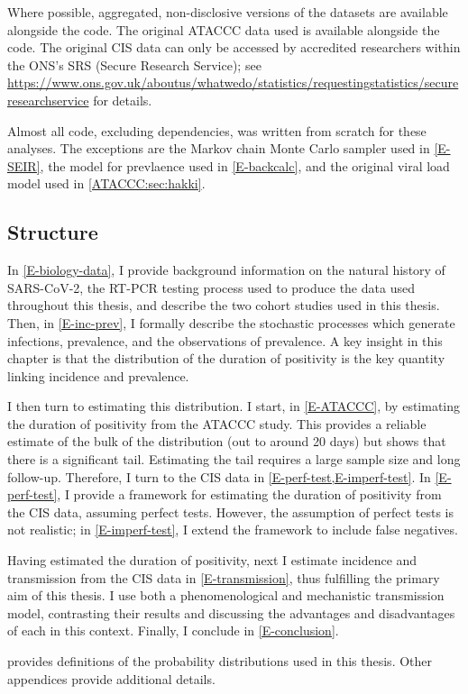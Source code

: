 \documentclass[thesis.tex]{subfiles}
\begin{document}
Where possible, aggregated, non-disclosive versions of the datasets are available alongside the code.
The original ATACCC data used is available alongside the code.
The original CIS data can only be accessed by accredited researchers within the ONS's SRS (Secure Research Service); see \url{https://www.ons.gov.uk/aboutus/whatwedo/statistics/requestingstatistics/secureresearchservice} for details.

Almost all code, excluding dependencies, was written from scratch for these analyses.
The exceptions are the Markov chain Monte Carlo sampler used in \cref{E-SEIR}, the model for prevlaence used in \cref{E-backcalc}, and the original viral load model used in \cref{ATACCC:sec:hakki}.

\subsection{Structure}

In \cref{E-biology-data}, I provide background information on the natural history of SARS-CoV-2, the RT-PCR testing process used to produce the data used throughout this thesis, and describe the two cohort studies used in this thesis.
Then, in \cref{E-inc-prev}, I formally describe the stochastic processes which generate infections, prevalence, and the observations of prevalence.
A key insight in this chapter is that the distribution of the duration of positivity is the key quantity linking incidence and prevalence.

I then turn to estimating this distribution.
I start, in \cref{E-ATACCC}, by estimating the duration of positivity from the ATACCC study.
This provides a reliable estimate of the bulk of the distribution (out to around 20 days) but shows that there is a significant tail.
Estimating the tail requires a large sample size and long follow-up. 
Therefore, I turn to the CIS data in \cref{E-perf-test,E-imperf-test}.
In \cref{E-perf-test}, I provide a framework for estimating the duration of positivity from the CIS data, assuming perfect tests.
However, the assumption of perfect tests is not realistic; in \cref{E-imperf-test}, I extend the framework to include false negatives.

Having estimated the duration of positivity, next I estimate incidence and transmission from the CIS data in \cref{E-transmission}, thus fulfilling the primary aim of this thesis.
I use both a phenomenological and mechanistic transmission model, contrasting their results and discussing the advantages and disadvantages of each in this context.
Finally, I conclude in \cref{E-conclusion}.

 provides definitions of the probability distributions used in this thesis.
Other appendices provide additional details.

\ifSubfilesClassLoaded{
  \appendix
%   
  \listoftodos
}{}
\end{document}
